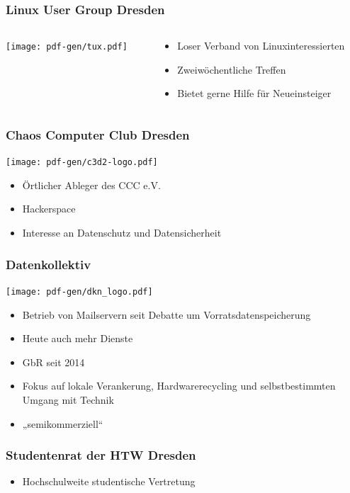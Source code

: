\documentclass[t]{beamer}
\begin{document}
\begin{frame}
  \frametitle{Linux User Group Dresden}
  \begin{columns}
    \begin{column}[T]{0.45\textwidth}
      \texttt{[image: pdf-gen/tux.pdf]}
    \end{column}
    \begin{column}{0.45\textwidth}
      \begin{itemize}
      \item Loser Verband von Linuxinteressierten
      \item Zweiwöchentliche Treffen
      \item Bietet gerne Hilfe für Neueinsteiger
      \end{itemize}
    \end{column}
  \end{columns}
\end{frame}

\begin{frame}
  \frametitle{Chaos Computer Club Dresden}
  \begin{center}
    \texttt{[image: pdf-gen/c3d2-logo.pdf]}
  \end{center}
  \begin{itemize}
  \item Örtlicher Ableger des CCC e.V.
  \item Hackerspace
  \item Interesse an Datenschutz und Datensicherheit
  \end{itemize}
\end{frame}

\begin{frame}
  \frametitle{Datenkollektiv}
  \texttt{[image: pdf-gen/dkn\_logo.pdf]}
  \begin{itemize}
  \item Betrieb von Mailservern seit Debatte um Vorratsdatenspeicherung
  \item Heute auch mehr Dienste
  \item GbR seit 2014
  \item Fokus auf lokale Verankerung, Hardwarerecycling und selbstbestimmten Umgang mit Technik
  \item „semikommerziell“
  \end{itemize}
\end{frame}

\begin{frame}
  \frametitle{Studentenrat der HTW Dresden}
  \begin{itemize}
  \item Hochschulweite studentische Vertretung
  \end{itemize}
\end{frame}
\end{document}
